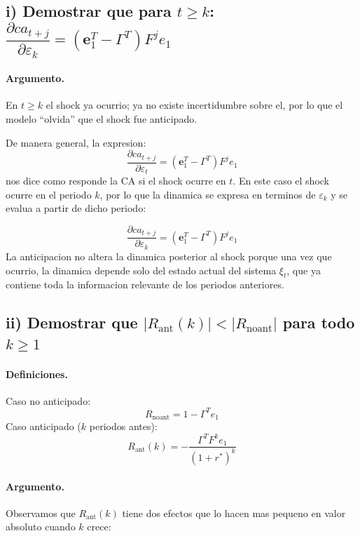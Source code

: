 \subsection*{i) Demostrar que para $t \geq k$: $\dfrac{\partial ca_{t+j}}{\partial \varepsilon_k} = (\mathbf{e}_1^T - \Gamma^T) F^j e_1$}

\paragraph{Argumento.}

En $t \geq k$ el shock ya ocurrio; ya no existe incertidumbre sobre el, por lo que el modelo ``olvida'' que el shock fue anticipado.

De manera general, la expresion:
\[
    \frac{\partial ca_{t+j}}{\partial \varepsilon_t} = (\mathbf{e}_1^T - \Gamma^T) F^j e_1
\]
nos dice como responde la CA si el shock ocurre en $t$. En este caso el shock ocurre en el periodo $k$, por lo que la dinamica se expresa en terminos de $\varepsilon_k$ y se evalua a partir de dicho periodo:

\begin{resultado}
\[
    \frac{\partial ca_{t+j}}{\partial \varepsilon_k} = (\mathbf{e}_1^T - \Gamma^T) F^j e_1
\]
La anticipacion no altera la dinamica posterior al shock porque una vez que ocurrio, la dinamica depende solo del estado actual del sistema $\xi_t$, que ya contiene toda la informacion relevante de los periodos anteriores.
\end{resultado}

\subsection*{ii) Demostrar que $|R_{\text{ant}}(k)| < |R_{\text{noant}}|$ para todo $k \geq 1$}

\paragraph{Definiciones.}

Caso no anticipado:
\[
    R_{\text{noant}} = 1 - \Gamma^T e_1
\]
Caso anticipado ($k$ periodos antes):
\[
    R_{\text{ant}}(k) = -\frac{\Gamma^T F^k e_1}{(1+r^*)^k}
\]

\paragraph{Argumento.}

Observamos que $R_{\text{ant}}(k)$ tiene dos efectos que lo hacen mas pequeno en valor absoluto cuando $k$ crece:

